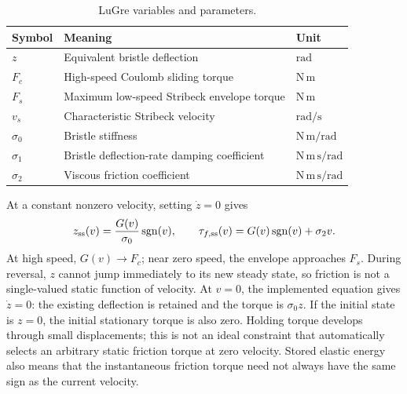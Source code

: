 \documentclass[11pt,a4paper]{report}
\newcommand{\sgn}{\operatorname{sgn}}
\begin{document}
\begin{table}[htbp]
\centering
\caption{LuGre variables and parameters.}
\begin{tabular}{lll}
\toprule
Symbol & Meaning & Unit\\
\midrule
$z$ & Equivalent bristle deflection & $\mathrm{rad}$\\
$F_c$ & High-speed Coulomb sliding torque & $\mathrm{N\,m}$\\
$F_s$ & Maximum low-speed Stribeck envelope torque & $\mathrm{N\,m}$\\
$v_s$ & Characteristic Stribeck velocity & $\mathrm{rad/s}$\\
$\sigma_0$ & Bristle stiffness & $\mathrm{N\,m/rad}$\\
$\sigma_1$ & Bristle deflection-rate damping coefficient & $\mathrm{N\,m\,s/rad}$\\
$\sigma_2$ & Viscous friction coefficient & $\mathrm{N\,m\,s/rad}$\\
\bottomrule
\end{tabular}
\end{table}

At a constant nonzero velocity, setting $\dot z=0$ gives
\begin{equation}
 z_{\rm ss}(v)=\frac{G(v)}{\sigma_0}\sgn(v),\qquad
 \tau_{f,\rm ss}(v)=G(v)\sgn(v)+\sigma_2v.
 \label{eq:ss}
\end{equation}
At high speed, $G(v)\to F_c$; near zero speed, the envelope approaches $F_s$. During reversal, $z$ cannot jump immediately to its new steady state, so friction is not a single-valued static function of velocity. At $v=0$, the implemented equation gives $\dot z=0$: the existing deflection is retained and the torque is $\sigma_0z$. If the initial state is $z=0$, the initial stationary torque is also zero. Holding torque develops through small displacements; this is not an ideal constraint that automatically selects an arbitrary static friction torque at zero velocity. Stored elastic energy also means that the instantaneous friction torque need not always have the same sign as the current velocity.
\end{document}
